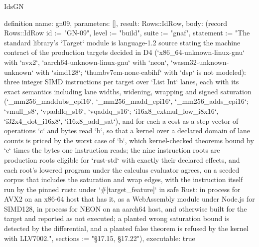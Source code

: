 \begin{lexlean}{IdsGN}
\begin{semanticmodule}
definition{
  name: gn09,
  parameters: [],
  result: Rows::IdRow,
  body: (record Rows::IdRow {id := "GN-09", level := "build", suite := "gnaf", statement := "The standard library's `Target` module is language-1.2 source stating the machine contract of the production targets decided in D4 (`x86_64-unknown-linux-gnu` with `avx2`, `aarch64-unknown-linux-gnu` with `neon`, `wasm32-unknown-unknown` with `simd128`; `thumbv7em-none-eabihf` with `dsp` is not modeled): three integer SIMD instructions per target over `List Int` lanes, each with its exact semantics including lane widths, widening, wrapping and signed saturation (`_mm256_maddubs_epi16`, `_mm256_madd_epi16`, `_mm256_adds_epi16`; `vmull_s8`, `vpaddlq_s16`, `vqaddq_s16`; `i16x8_extmul_low_i8x16`, `i32x4_dot_i16x8`, `i16x8_add_sat`), and for each a cost as a step vector of operations `c` and bytes read `b`, so that a kernel over a declared domain of lane counts is priced by the worst case of `b`, which kernel-checked theorems bound by `c` times the bytes one instruction reads; the nine instruction roots are production roots eligible for `rust-std` with exactly their declared effects, and each root's lowered program under the calculus evaluator agrees, on a seeded corpus that includes the saturation and wrap edges, with the instruction itself run by the pinned rustc under `#[target_feature]` in safe Rust: in process for AVX2 on an x86-64 host that has it, as a WebAssembly module under Node.js for SIMD128, in process for NEON on an aarch64 host, and otherwise built for the target and reported as not executed; a planted wrong saturation bound is detected by the differential, and a planted false theorem is refused by the kernel with LLV7002.", sections := "§17.15, §17.22"}),
  executable: true
}
\end{semanticmodule}
\end{lexlean}
